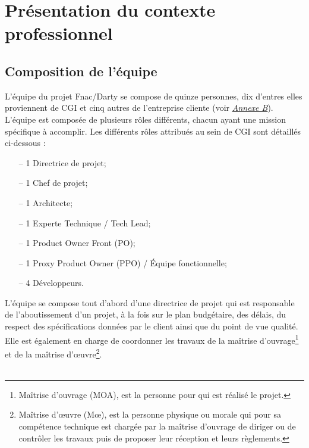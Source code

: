 \documentclass[12pt, a4paper]{report}
\begin{document}
	\chapter{Présentation du contexte professionnel}
	\section{Composition de l'équipe}

	L'équipe du projet Fnac/Darty se compose de quinze personnes, dix d'entres elles proviennent de CGI et cinq autres de l'entreprise cliente (voir \hyperref[sec:organigramme]{\it{Annexe B}}). L'équipe est composée de plusieurs rôles différents, chacun ayant une mission spécifique à accomplir. Les différents rôles attribués au sein de CGI sont détaillés ci-dessous : 
	\\
	\begin{itemize}
		\item[–] 1 Directrice de projet; %
		\item[–] 1 Chef de projet; %
		\item[–] 1 Architecte; %
		\item[–] 1 Experte Technique / Tech Lead; %
		\item[–] 1 Product Owner Front (PO); %
		\item[–] 1 Proxy Product Owner (PPO) / Équipe fonctionnelle; %
		\item[–] 4 Développeurs.\\
	\end{itemize}
	\noindent
	L'équipe se compose tout d'abord d'une directrice de projet qui est responsable de l'aboutissement d'un projet, à la fois sur le plan budgétaire, des délais, du respect des spécifications données par le client ainsi que du point de vue qualité. Elle est également en charge de coordonner les travaux de la maîtrise d'ouvrage\footnote{Maîtrise d'ouvrage (MOA), est la personne pour qui est réalisé le projet.} et de la maîtrise d'œuvre\footnote{Maîtrise d'œuvre (Mœ), est la personne physique ou morale qui pour sa compétence technique est chargée par la maîtrise d'ouvrage de diriger ou de contrôler les travaux puis de proposer leur réception et leurs règlements.}.
	\\\\
\end{document}
